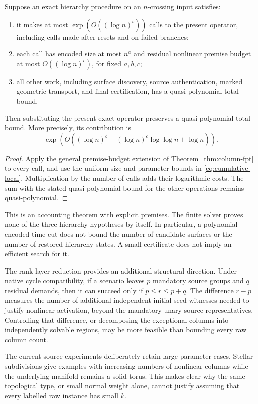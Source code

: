 \begin{theorem}
\label{thm:global-transfer}
Suppose an exact hierarchy procedure on an $n$-crossing input satisfies:
\begin{enumerate}
\item it makes at most $\exp(O((\log n)^b))$ calls to the present operator,
including calls made after resets and on failed branches;
\item each call has encoded size at most $n^a$ and residual nonlinear
premise budget at most $O((\log n)^c)$, for fixed $a,b,c$;
\item all other work, including surface discovery, source authentication,
marked geometric transport, and final certification, has a
quasi-polynomial total bound.
\end{enumerate}
Then substituting the present exact operator preserves a
quasi-polynomial total bound. More precisely, its contribution is
\[
 \exp\!\left(O((\log n)^b+(
                   \log n)^c\log\log n+\log n)\right).
\]
\end{theorem}
\begin{proof}
Apply the general premise-budget extension of
Theorem~\ref{thm:column-fpt} to every call, and use the uniform size and
parameter bounds in \eqref{eq:cumulative-local}. Multiplication by the
number of calls adds their logarithmic costs. The sum with the stated
quasi-polynomial bound for the other operations remains quasi-polynomial.
\end{proof}

This is an accounting theorem with explicit premises. The finite solver
proves none of the three hierarchy hypotheses by itself. In particular,
a polynomial encoded-time cut does not bound the number of candidate
surfaces or the number of restored hierarchy states. A small certificate
does not imply an efficient search for it.

The rank-layer reduction provides an additional structural direction.
Under native cycle compatibility, if a scenario leaves $p$ mandatory
source groups and $q$ residual demands, then it can succeed only if
$p\le r\le p+q$. The difference $r-p$ measures the number of
additional independent initial-seed witnesses needed to justify nonlinear
activation, beyond the mandatory unary source representatives. Controlling that difference, or decomposing the exceptional
columns into independently solvable regions, may be more feasible than
bounding every raw column count.

The current source experiments deliberately retain large-parameter cases.
Stellar subdivisions give examples with increasing numbers of nonlinear
columns while the underlying manifold remains a solid torus. This makes
clear why the same topological type, or small normal weight alone, cannot
justify assuming that every labelled raw instance has small $k$.
